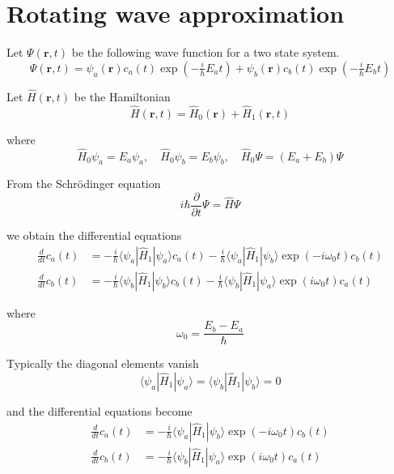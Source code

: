 

\section*{Rotating wave approximation}

Let $\Psi(\mathbf r,t)$ be the following wave function for a two state system.
\begin{equation*}
\Psi(\mathbf r,t)=\psi_a(\mathbf r)c_a(t)\exp(-\tfrac{i}{\hbar}E_at)+
\psi_b(\mathbf r)c_b(t)\exp(-\tfrac{i}{\hbar}E_bt)
\end{equation*}

Let $\hat H(\mathbf r,t)$ be the Hamiltonian
\begin{equation*}
\hat H(\mathbf r,t)=\hat H_0(\mathbf r)+\hat H_1(\mathbf r,t)
\end{equation*}

where
\begin{equation*}
\hat H_0\psi_a=E_a\psi_a,\quad\hat H_0\psi_b=E_b\psi_b,\quad
\hat H_0\Psi=(E_a+E_b)\Psi
\end{equation*}

From the Schr\"odinger equation
\begin{equation*}
i\hbar\frac{\partial}{\partial t}\Psi=\hat H\Psi
\end{equation*}

we obtain the differential equations
\begin{equation*}
\begin{aligned}
\frac{d}{dt}c_a(t)&=-\frac{i}{\hbar}\langle\psi_a|\hat H_1|\psi_a\rangle c_a(t)
-\frac{i}{\hbar}\langle\psi_a|\hat H_1|\psi_b\rangle\exp(-i\omega_0t)c_b(t)
\\[1ex]
\frac{d}{dt}c_b(t)&=-\frac{i}{\hbar}\langle\psi_b|\hat H_1|\psi_b\rangle c_b(t)
-\frac{i}{\hbar}\langle\psi_b|\hat H_1|\psi_a\rangle\exp(i\omega_0t)c_a(t)
\end{aligned}
\end{equation*}

where
\begin{equation*}
\omega_0=\frac{E_b-E_a}{\hbar}
\end{equation*}

Typically the diagonal elements vanish
\begin{equation*}
\langle\psi_a|\hat H_1|\psi_a\rangle=\langle\psi_b|\hat H_1|\psi_b\rangle=0
\end{equation*}

and the differential equations become
\begin{align*}
\frac{d}{dt}c_a(t)&=-\frac{i}{\hbar}\langle\psi_a|\hat H_1|\psi_b\rangle\exp(-i\omega_0t)c_b(t)
\tag{1}
\\[1ex]
\frac{d}{dt}c_b(t)&=-\frac{i}{\hbar}\langle\psi_b|\hat H_1|\psi_a\rangle\exp(i\omega_0t)c_a(t)
\tag{2}
\end{align*}

